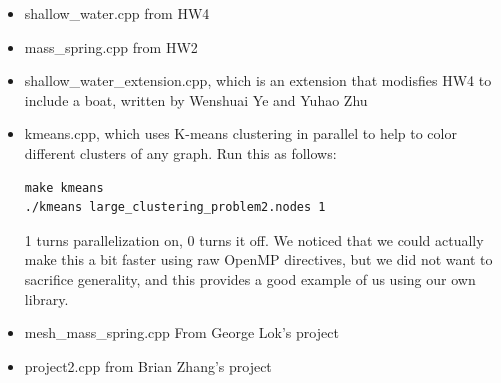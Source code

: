 \documentclass{article}
\begin{document}
\begin{itemize}
\item shallow\_water.cpp from HW4
\item mass\_spring.cpp from HW2
\item shallow\_water\_extension.cpp, which is an extension that modisfies HW4 to include a boat, written by Wenshuai Ye and Yuhao Zhu
\item kmeans.cpp, which uses K-means clustering in parallel to help to color different clusters of any graph.  Run this as follows:
\begin{verbatim}
make kmeans
./kmeans large_clustering_problem2.nodes 1
\end{verbatim}
1 turns parallelization on, 0 turns it off.  We noticed that we could actually make this a bit faster using raw OpenMP directives, but we did not want to sacrifice generality, and this provides a good example of us using our own library.
\item mesh\_mass\_spring.cpp From George Lok's project
\item project2.cpp from Brian Zhang's project
\end{itemize}
\end{document}
